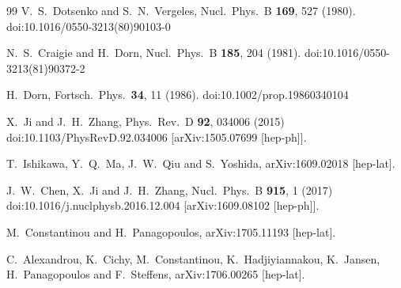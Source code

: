 \documentclass[prd,aps,twocolumn,preprintnumbers, showpacs, nofootinbib,superscriptaddress,notitlepage]{revtex4-1}
\begin{document}
\begin{thebibliography}{99}
  V.~S.~Dotsenko and S.~N.~Vergeles,
  Nucl.\ Phys.\ B {\bf 169}, 527 (1980).
  doi:10.1016/0550-3213(80)90103-0

  N.~S.~Craigie and H.~Dorn,
  Nucl.\ Phys.\ B {\bf 185}, 204 (1981).
  doi:10.1016/0550-3213(81)90372-2

  H.~Dorn,
  Fortsch.\ Phys.\  {\bf 34}, 11 (1986).
  doi:10.1002/prop.19860340104

  X.~Ji and J.~H.~Zhang,
  Phys.\ Rev.\ D {\bf 92}, 034006 (2015)
  doi:10.1103/PhysRevD.92.034006
  [arXiv:1505.07699 [hep-ph]].

  T.~Ishikawa, Y.~Q.~Ma, J.~W.~Qiu and S.~Yoshida,
  arXiv:1609.02018 [hep-lat].

  J.~W.~Chen, X.~Ji and J.~H.~Zhang,
  Nucl.\ Phys.\ B {\bf 915}, 1 (2017)
  doi:10.1016/j.nuclphysb.2016.12.004
  [arXiv:1609.08102 [hep-ph]].

  M.~Constantinou and H.~Panagopoulos,
  arXiv:1705.11193 [hep-lat].

  C.~Alexandrou, K.~Cichy, M.~Constantinou, K.~Hadjiyiannakou, K.~Jansen, H.~Panagopoulos and F.~Steffens,
  arXiv:1706.00265 [hep-lat].



\end{thebibliography}
\end{document}
